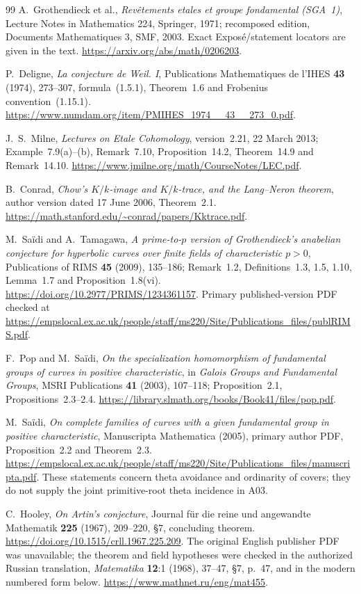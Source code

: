 \documentclass[11pt,a4paper]{article}
\begin{document}
\begin{thebibliography}{99}
A.~Grothendieck et al., \emph{Rev\^etements etales et groupe fondamental
(SGA~1)}, Lecture Notes in Mathematics 224, Springer, 1971;
recomposed edition, Documents Mathematiques 3, SMF, 2003.
Exact Expos\'e/statement locators are given in the text.
\url{https://arxiv.org/abs/math/0206203}.

P.~Deligne, \emph{La conjecture de Weil. I}, Publications
Mathematiques de l'IHES \textbf{43} (1974), 273--307,
formula~(1.5.1), Theorem~1.6 and Frobenius convention~(1.15.1).
\url{https://www.numdam.org/item/PMIHES_1974__43__273_0.pdf}.

J.~S.~Milne, \emph{Lectures on Etale Cohomology}, version~2.21,
22 March 2013; Example~7.9(a)--(b), Remark~7.10,
Proposition~14.2, Theorem~14.9 and Remark~14.10.
\url{https://www.jmilne.org/math/CourseNotes/LEC.pdf}.

B.~Conrad, \emph{Chow's $K/k$-image and $K/k$-trace, and the
Lang--Neron theorem}, author version dated 17 June 2006,
Theorem~2.1. \url{https://math.stanford.edu/~conrad/papers/Kktrace.pdf}.

M.~Sa\"idi and A.~Tamagawa, \emph{A prime-to-$p$ version of
Grothendieck's anabelian conjecture for hyperbolic curves over finite
fields of characteristic $p>0$}, Publications of RIMS
\textbf{45} (2009), 135--186; Remark~1.2,
Definitions~1.3, 1.5, 1.10, Lemma~1.7 and Proposition~1.8(vi).
\url{https://doi.org/10.2977/PRIMS/1234361157}.
Primary published-version PDF checked at
\url{https://empslocal.ex.ac.uk/people/staff/ms220/Site/Publications_files/publRIMS.pdf}.

F.~Pop and M.~Sa\"idi, \emph{On the specialization homomorphism
of fundamental groups of curves in positive characteristic},
in \emph{Galois Groups and Fundamental Groups}, MSRI Publications
\textbf{41} (2003), 107--118; Proposition~2.1,
Propositions~2.3--2.4.
\url{https://library.slmath.org/books/Book41/files/pop.pdf}.

M.~Sa\"idi, \emph{On complete families of curves with a given
fundamental group in positive characteristic}, Manuscripta
Mathematica (2005), primary author PDF, Proposition~2.2 and
Theorem~2.3. \url{https://empslocal.ex.ac.uk/people/staff/ms220/Site/Publications_files/manuscripta.pdf}.
These statements concern theta avoidance and ordinarity of covers;
they do not supply the joint primitive-root theta incidence in A03.

C.~Hooley, \emph{On Artin's conjecture}, Journal f\"ur die reine
und angewandte Mathematik \textbf{225} (1967), 209--220,
\S7, concluding theorem.
\url{https://doi.org/10.1515/crll.1967.225.209}.
The original English publisher PDF was unavailable; the theorem and
field hypotheses were checked in the authorized Russian translation,
\emph{Matematika} \textbf{12}:1 (1968), 37--47,
\S7, p.~47, and in the modern numbered form below.
\url{https://www.mathnet.ru/eng/mat455}.


\end{thebibliography}
\end{document}
